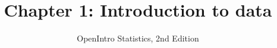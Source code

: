 \documentclass[slidestop,compress,mathserif]{beamer}
\title[Chp 1: Intro. to data]{Chapter 1: Introduction to data}
\author{OpenIntro Statistics, 2nd Edition}
\date{}
\institute{}
\begin{document}


\begin{frame}[plain]

\titlepage

\end{frame}











\end{document}
